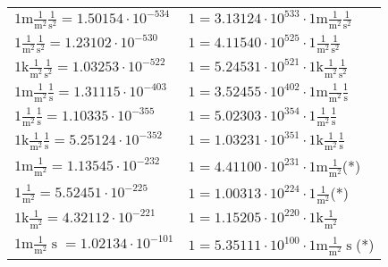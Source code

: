 \begin{center}
\begin{longtable}{l l}
{\color{gray}$1 \bm{\mathrm{ m}}\frac1{\operatorname{m}^2}\frac1{\operatorname{s}^2}{}{} = 1.50154\cdot10^{-534} $}   & {\color{gray}$ 1 = 3.13124\cdot10^{533} \cdot 1 \bm{\mathrm{ m}}\frac1{\operatorname{m}^2}\frac1{\operatorname{s}^2}{}{}$}  \\
{\color{black}$1 \bm{\mathrm{ }}\frac1{\operatorname{m}^2}\frac1{\operatorname{s}^2}{}{} = 1.23102\cdot10^{-530} $}   & {\color{black}$ 1 = 4.11540\cdot10^{525} \cdot 1 \bm{\mathrm{ }}\frac1{\operatorname{m}^2}\frac1{\operatorname{s}^2}{}{}$}  \\
{\color{gray}$1 \bm{\mathrm{ k}}\frac1{\operatorname{m}^2}\frac1{\operatorname{s}^2}{}{} = 1.03253\cdot10^{-522} $}   & {\color{gray}$ 1 = 5.24531\cdot10^{521} \cdot 1 \bm{\mathrm{ k}}\frac1{\operatorname{m}^2}\frac1{\operatorname{s}^2}{}{}$}  \\
{\color{gray}$1 \bm{\mathrm{ m}}\frac1{\operatorname{m}^2}\frac1{\operatorname{s}}{}{} = 1.31115\cdot10^{-403} $}   & {\color{gray}$ 1 = 3.52455\cdot10^{402} \cdot 1 \bm{\mathrm{ m}}\frac1{\operatorname{m}^2}\frac1{\operatorname{s}}{}{}$}  \\
{\color{black}$1 \bm{\mathrm{ }}\frac1{\operatorname{m}^2}\frac1{\operatorname{s}}{}{} = 1.10335\cdot10^{-355} $}   & {\color{black}$ 1 = 5.02303\cdot10^{354} \cdot 1 \bm{\mathrm{ }}\frac1{\operatorname{m}^2}\frac1{\operatorname{s}}{}{}$}  \\
{\color{gray}$1 \bm{\mathrm{ k}}\frac1{\operatorname{m}^2}\frac1{\operatorname{s}}{}{} = 5.25124\cdot10^{-352} $}   & {\color{gray}$ 1 = 1.03231\cdot10^{351} \cdot 1 \bm{\mathrm{ k}}\frac1{\operatorname{m}^2}\frac1{\operatorname{s}}{}{}$}  \\
{\color{gray}$1 \bm{\mathrm{ m}}\frac1{\operatorname{m}^2}{}{}{} = 1.13545\cdot10^{-232} $}   & {\color{gray}$ 1 = 4.41100\cdot10^{231} \cdot 1 \bm{\mathrm{ m}}\frac1{\operatorname{m}^2}{}{}{}$}\quad(*)\\
{\color{black}$1 \bm{\mathrm{ }}\frac1{\operatorname{m}^2}{}{}{} = 5.52451\cdot10^{-225} $}   & {\color{black}$ 1 = 1.00313\cdot10^{224} \cdot 1 \bm{\mathrm{ }}\frac1{\operatorname{m}^2}{}{}{}$}\quad(*)\\
{\color{gray}$1 \bm{\mathrm{ k}}\frac1{\operatorname{m}^2}{}{}{} = 4.32112\cdot10^{-221} $}   & {\color{gray}$ 1 = 1.15205\cdot10^{220} \cdot 1 \bm{\mathrm{ k}}\frac1{\operatorname{m}^2}{}{}{}$}  \\
{\color{gray}$1 \bm{\mathrm{ m}}\frac1{\operatorname{m}^2}{\operatorname{s}}{}{} = 1.02134\cdot10^{-101} $}   & {\color{gray}$ 1 = 5.35111\cdot10^{100} \cdot 1 \bm{\mathrm{ m}}\frac1{\operatorname{m}^2}{\operatorname{s}}{}{}$}\quad(*)\\

\end{longtable}
\end{center}
